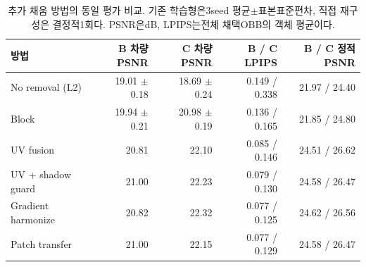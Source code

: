 \begin{table}[htbp]\centering\scriptsize
\caption{추가 채움 방법의 동일 평가 비교. 기존 학습형은3seed 평균$\pm$표본표준편차, 직접 재구성은 결정적1회다. PSNR은dB, LPIPS는전체 채택OBB의 객체 평균이다.}
\begin{tabular}{lrrrr}\toprule 방법 & B 차량 PSNR & C 차량 PSNR & B / C LPIPS & B / C 정적 PSNR\\\midrule
No removal (L2) & 19.01 $\pm$ 0.18 & 18.69 $\pm$ 0.24 & 0.149 / 0.338 & 21.97 / 24.40 \\
Block & 19.94 $\pm$ 0.21 & 20.98 $\pm$ 0.19 & 0.136 / 0.165 & 21.85 / 24.80 \\
UV fusion & 20.81 & 22.10 & 0.085 / 0.146 & 24.51 / 26.62 \\
UV + shadow guard & 21.00 & 22.23 & 0.079 / 0.130 & 24.58 / 26.47 \\
Gradient harmonize & 20.82 & 22.32 & 0.077 / 0.125 & 24.62 / 26.56 \\
Patch transfer & 21.00 & 22.15 & 0.077 / 0.129 & 24.58 / 26.47 \\\bottomrule\end{tabular}\end{table}